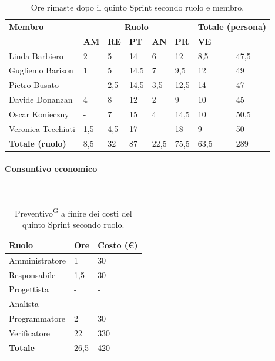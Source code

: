 \documentclass[8pt]{article}
\newcommand{\glossterm}[1]{#1\textsuperscript{G}} %
\newcommand{\subsubsubsection}[1]{\paragraph{#1}\mbox{}\\}
\begin{document}
\begin{table}[ht!]
	\centering
	\begin{tabular}{p{3cm} p{1.4cm} p{1.6cm} p{1.5cm} p{1.5cm} p{1.5cm} p{1.5cm} p{2cm}}
		\toprule
        \textbf{Membro} & \multicolumn{5}{c}{\textbf{Ruolo}} & \multicolumn{2}{r}{\textbf{Totale (persona)}}\\
		& \textbf{AM} & \textbf{RE} & \textbf{PT} & \textbf{AN} & \textbf{PR} & \textbf{VE}\\
		\midrule
        Linda Barbiero     & 2    & 5   & 14   & 6   & 12   & 8,5 & 47,5 \\
        Gugliemo Barison   & 1    & 5   & 14,5 & 7   & 9,5  & 12  & 49 \\
        Pietro Busato      & -   & 2,5 & 14,5 & 3,5 & 12,5 & 14  & 47 \\
        Davide Donanzan    & 4    & 8   & 12   & 2   & 9    & 10  & 45 \\
        Oscar Konieczny    & - & 7   & 15   & 4   & 14,5 & 10  & 50,5 \\
        Veronica Tecchiati & 1,5  & 4,5 & 17   & -   & 18   & 9   & 50 \\
        \midrule
        \textbf{Totale (ruolo)} & 8,5 & 32 & 87 & 22,5 & 75,5 & 63,5 & 289 \\
		\bottomrule
	\end{tabular}
	\caption{Ore rimaste dopo il quinto Sprint secondo ruolo e membro.}
	\label{table:Ore rimaste dopo il quinto Sprint secondo ruolo e membro.}
\end{table}
\subsubsubsection{Consuntivo economico}
\begin{table}[ht!]
    \centering
    \begin{tabular}{p{4cm} p{1.8cm} p{2.2cm}}
        \toprule
        \textbf{Ruolo} & \textbf{Ore} & \textbf{Costo (€)} \\
        \midrule
        Amministratore & 1 & 30 \\
        Responsabile & 1,5  & 30 \\
        Progettista & -  & - \\
        Analista & - & - \\
        Programmatore & 2 & 30 \\
        Verificatore & 22 & 330 \\
        \bottomrule
        \textbf{Totale} & 26,5 & 420
    \end{tabular}
    \caption{\glossterm{Preventivo} a finire dei costi del quinto Sprint secondo ruolo.}
    \label{table:Preventivo a finire dei costi del quinto Sprint secondo ruolo}
\end{table}
\end{document}
